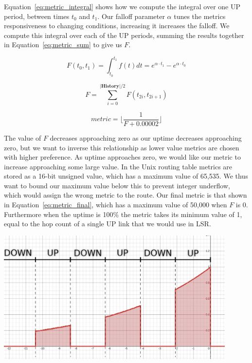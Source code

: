 \documentclass[withindex,glossary,openany]{cam-thesis}
\begin{document}
Equation~\ref{eq:metric_integral} shows how we compute the integral over one UP period, between times $t_0$ and $t_1$. Our falloff parameter $\alpha$ tunes the metrics responsiveness to changing conditions, increasing it increases the falloff. We compute this integral over each of the UP periods, summing the results together in Equation~\ref{eq:metric_sum} to give us $F$.

\begin{equation} \label{eq:metric_integral}
F(t_0, t_1) = \int_{t_0}^{t_1} f(t)dt = e^{\alpha \cdot t_1} - e^{\alpha \cdot t_0}
\end{equation}

\begin{equation} \label{eq:metric_sum}
F = \sum_{i = 0}^{|\textbf{History}|/2} F(t_{2i}, t_{2i+1})
\end{equation}

\begin{equation} \label{eq:metric_final}
\textit{metric} = \Big\lfloor\frac{1}{F+0.00002}\Big\rfloor
\end{equation}

The value of $F$ decreases approaching zero as our uptime decreases approaching zero, but we want to inverse this relationship as lower value metrics are chosen with higher preference. As uptime approaches zero, we would like our metric to increase approaching some large value. In the Unix routing table metrics are stored as a 16-bit unsigned value, which has a maximum value of 65,535. We thus want to bound our maximum value below this to prevent integer underflow, which would assign the wrong metric to the route. Our final metric is that shown in Equation~\ref{eq:metric_final}, which has a maximum value of 50,000 when $F$ is 0. Furthermore when the uptime is 100\% the metric takes its minimum value of 1, equal to the hop count of a single UP link that we would use in LSR.

\begin{center}
\begin{minipage}{0.9\textwidth} \centering
	\includegraphics[width=0.9\textwidth]{metric}
	\label{fig:metric}
\end{minipage}
\end{center}
\end{document}
